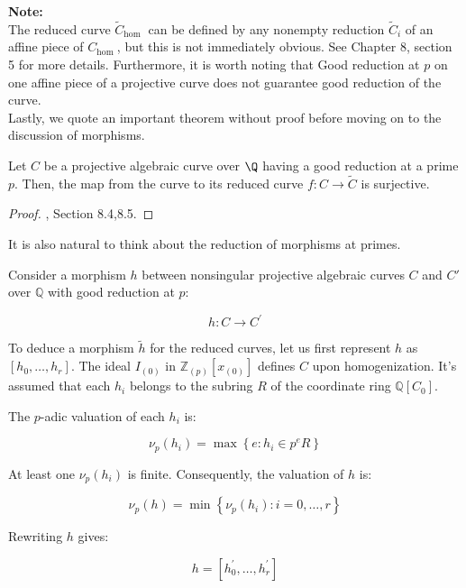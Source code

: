 \textbf{Note:}\\ The reduced curve $\widetilde{C}_{\text {hom }}$ can be defined by any nonempty reduction $\widetilde{C}_{i}$ of an affine piece of $C_{\text {hom }}$, but this is not immediately obvious. See \cite{diamond2005first} Chapter 8, section 5 for more details. Furthermore, it is worth noting that Good reduction at $p$ on one affine piece of a projective curve does not guarantee good reduction of the curve. \\

Lastly, we quote an important theorem without proof before moving on to the discussion of morphisms. 

\begin{theorem}
    Let $C$ be a projective algebraic curve over $\Q$ having a good reduction at a prime $p$. Then, the map from the curve to its reduced curve $f: C  \longrightarrow \widetilde{C}$ is surjective. 
\end{theorem}
\begin{proof}
\cite{diamond2005first}, Section 8.4,8.5. 
    
\end{proof}

It is also natural to think about the reduction of morphisms at primes. 

Consider a morphism \( h \) between nonsingular projective algebraic curves \( C \) and \( C' \) over \( \mathbb{Q} \) with good reduction at \( p \):

\[
h: C \longrightarrow C^{\prime}
\]

To deduce a morphism \( \widetilde{h} \) for the reduced curves, let us first represent \( h \) as \( \left[h_{0}, \ldots, h_{r}\right] \). The ideal \( I_{(0)} \) in \( \mathbb{Z}_{(p)}\left[x_{(0)}\right] \) defines \( C \) upon homogenization. It's assumed that each \( h_{i} \) belongs to the subring \( R \) of the coordinate ring \( \mathbb{Q}\left[C_{0}\right] \). 

The \( p \)-adic valuation of each \( h_{i} \) is:

\[
\nu_{p}\left(h_{i}\right)=\max \left\{e: h_{i} \in p^{e} R\right\}
\]

At least one \( \nu_{p}\left(h_{i}\right) \) is finite. Consequently, the valuation of \( h \) is:

\[
\nu_{p}(h)=\min \left\{\nu_{p}\left(h_{i}\right): i=0, \ldots, r\right\}
\]

Rewriting \( h \) gives:

\[
h=\left[h_{0}^{\prime}, \ldots, h_{r}^{\prime}\right]
\]

